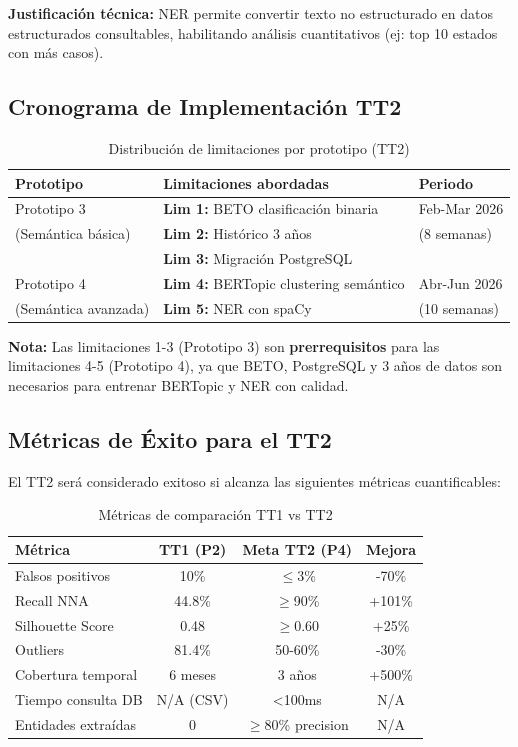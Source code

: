 \textbf{Justificación técnica:} NER permite convertir texto no estructurado en datos estructurados consultables, habilitando análisis cuantitativos (ej: top 10 estados con más casos).

\subsection{Cronograma de Implementación TT2}
\label{subsec:cronograma_tt2}

\begin{table}[h]
\centering
\caption{Distribución de limitaciones por prototipo (TT2)}
\label{tab:cronograma_tt2}
\begin{tabular}{|l|p{6cm}|l|}
\hline
\textbf{Prototipo} & \textbf{Limitaciones abordadas} & \textbf{Periodo} \\ \hline
Prototipo 3 & \textbf{Lim 1:} BETO clasificación binaria & Feb-Mar 2026 \\
(Semántica básica) & \textbf{Lim 2:} Histórico 3 años & (8 semanas) \\
& \textbf{Lim 3:} Migración PostgreSQL & \\ \hline
Prototipo 4 & \textbf{Lim 4:} BERTopic clustering semántico & Abr-Jun 2026 \\
(Semántica avanzada) & \textbf{Lim 5:} NER con spaCy & (10 semanas) \\ \hline
\end{tabular}
\end{table}

\textbf{Nota:} Las limitaciones 1-3 (Prototipo 3) son \textbf{prerrequisitos} para las limitaciones 4-5 (Prototipo 4), ya que BETO, PostgreSQL y 3 años de datos son necesarios para entrenar BERTopic y NER con calidad.

\subsection{Métricas de Éxito para el TT2}
\label{subsec:metricas_exito_tt2}

El TT2 será considerado exitoso si alcanza las siguientes métricas cuantificables:

\begin{table}[h]
\centering
\caption{Métricas de comparación TT1 vs TT2}
\label{tab:metricas_tt1_tt2}
\begin{tabular}{|l|c|c|c|}
\hline
\textbf{Métrica} & \textbf{TT1 (P2)} & \textbf{Meta TT2 (P4)} & \textbf{Mejora} \\ \hline
Falsos positivos & 10\% & $\leq$3\% & -70\% \\ \hline
Recall NNA & 44.8\% & $\geq$90\% & +101\% \\ \hline
Silhouette Score & 0.48 & $\geq$0.60 & +25\% \\ \hline
Outliers & 81.4\% & 50-60\% & -30\% \\ \hline
Cobertura temporal & 6 meses & 3 años & +500\% \\ \hline
Tiempo consulta DB & N/A (CSV) & <100ms & N/A \\ \hline
Entidades extraídas & 0 & $\geq$80\% precision & N/A \\ \hline
\end{tabular}
\end{table}

